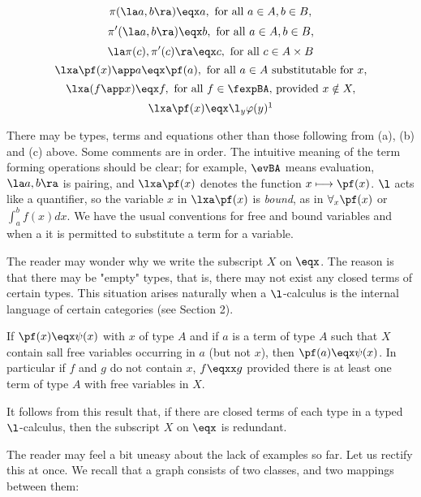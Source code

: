\begin{defn}
\begin{enumerate}[label=(c\theenumi)]
\begin{fleqn}
\[\pi(\la a,b \ra) \eqx a, \textrm{ for all } a \in A, b \in B,\]
\[\pi'(\la a,b \ra) \eqx b, \textrm{ for all } a \in A, b \in B,\]
\[\la \pi(c), \pi'(c) \ra \eqx c, \textrm{ for all } c \in A \times B \]
\[\lxa \pf(x)\app a \eqx \pf(a), \textrm{ for all } a \in A \hbox{ substitutable for } x,\]
\[\lxa (f \app x) \eqx f, \textrm{ for all } f \in \fexpBA \hbox{, provided } x \notin X,\]
\[\lxa \pf(x)\eqx \l_y \varphi(y)\footnotemark\]
\end{fleqn}
\end{enumerate}
\end{defn}
There may be types, terms and equations other than those following from
(a), (b) and (c) above.
%
Some comments are in order. The intuitive meaning of the term forming
operations should be clear; for example, $\evBA$ means evaluation,
$\la a,b\ra$ is pairing, and $\lxa \pf(x)$ denotes the function $x \longmapsto \pf(x)$.
$\l$ acts like a quantifier, so the variable $x$ in $\lxa \pf(x)$ is {\em bound}, 
as in $\forall_x \pf(x)$ or $\int_a^b f(x) dx$.
We have the usual conventions for free and bound variables and when
a it is permitted to substitute a term for a variable.

The reader may wonder why we write the subscript $X$ on $\eqx$. The reason
is that there may be "empty" types, that is, there may not exist any closed
terms of certain types. This situation arises naturally when a $\l$-calculus
is the internal language of certain categories (see Section 2).

\begin{prop}
If $\pf(x) \eqx \psi(x)$ with $x$ of type $A$ and if $a$ is a
term of type $A$ such that $X$ contain sall free variables occurring 
in $a$ (but not $x$), then $\pf(a) \eqx \psi(x)$. In particular if $f$
and $g$ do not contain $x$, $f \eqxx g$ provided there is at least one term of type
$A$ with free variables in $X$.
\end{prop}
It follows from this result that, if there are closed terms of each type
in a typed $\l$-calculus, then the subscript $X$ on $\eqx$ is redundant.

The reader may feel a bit uneasy about the lack of examples so far. Let
us rectify this at once. We recall that a graph consists of two classes, and
two mappings between them:

